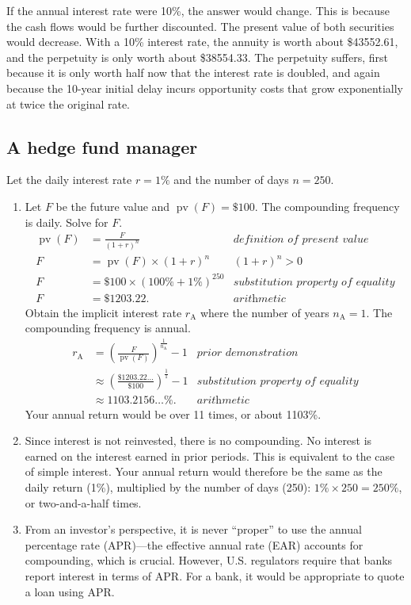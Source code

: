 \documentclass[12pt]{article}
\DeclareMathOperator{\pv}{pv}
\begin{document}
If the annual interest rate were 10\%, the answer would change. This is because the cash flows would be further discounted. The present value of both securities would decrease. With a 10\% interest rate, the annuity is worth about \$43552.61, and the perpetuity is only worth about \$38554.33. The perpetuity suffers, first because it is only worth half now that the interest rate is doubled, and again because the 10-year initial delay incurs opportunity costs that grow exponentially at twice the original rate.
\subsection{A hedge fund manager}
Let the daily interest rate $r=1\%$ and the number of days $n=250$.
\begin{enumerate}
\item Let $F$ be the future value and $\pv(F)=\$100$. The compounding frequency is daily. Solve for $F$.
\begin{align*}
\pv(F)&=\frac{F}{(1+r)^n}&\textit{definition of present value}\\
F&=\pv(F)\times(1+r)^n&(1+r)^n>0\\
F&=\$100\times(100\%+1\%)^{250}&\textit{substitution property of equality}\\
F&=\$1203.22.&\textit{arithmetic}
\end{align*}
Obtain the implicit interest rate $r_\mathrm{A}$ where the number of years $n_\mathrm{A}=1$. The compounding frequency is annual.
\begin{align*}
r_{\mathrm{A}}
&=\left(\frac{F}{\pv(F)}\right)^{\frac{1}{n_\mathrm{A}}}-1&\textit{prior demonstration}\\
&\approx\left(\frac{\$1203.22\dots}{\$100}\right)^{\frac{1}{1}}-1&\textit{substitution property of equality}\\
&\approx 1103.2156\dots\%.&\textit{arithmetic}
\end{align*}
Your annual return would be over 11 times, or about 1103\%.
\item Since interest is not reinvested, there is no compounding. No interest is earned on the interest earned in prior periods. This is equivalent to the case of simple interest. Your annual return would therefore be the same as the daily return (1\%), multiplied by the number of days (250): $1\%\times 250=250\%$, or two-and-a-half times.
\item From an investor's perspective, it is never ``proper'' to use the annual percentage rate (APR)---the effective annual rate (EAR) accounts for compounding, which is crucial. However, U.S. regulators require that banks report interest in terms of APR. For a bank, it would be appropriate to quote a loan using APR.
\end{enumerate}
\end{document}
